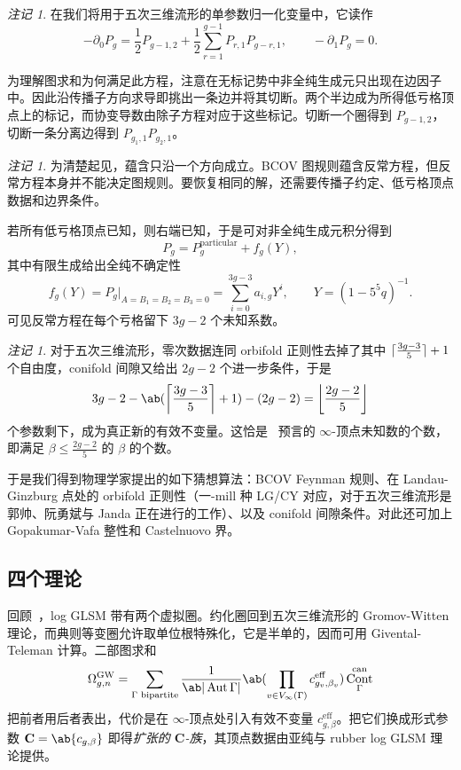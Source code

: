 \documentclass{amsart}
\theoremstyle{definition}
\theoremstyle{remark}
\newtheorem{rmk}[thm]{注记}
\theoremstyle{plain}
\theoremstyle{definition}
\theoremstyle{remark}
\DeclarePairedDelimiter{\floor}{\lfloor}{\rfloor}
\DeclarePairedDelimiter{\ceil}{\lceil}{\rceil}
\newcommand{\mbf}[1]{\mathbf{#1}}
\newcommand{\mr}[1]{\mathrm{#1}}
\newcommand{\1}{\mathbf{1}}
\newcommand{\2}{\mathbf{2}}
\newcommand{\3}{\mathbf{3}}
\DeclareMathOperator{\Aut}{Aut}
\DeclareMathOperator{\Cont}{Cont}
\begin{document}
\begin{rmk}
    在我们将用于五次三维流形的单参数归一化变量中，它读作
    \[ -\partial_0 P_g = \frac{1}{2}P_{g-1,2} + \frac{1}{2}\sum_{r=1}^{g-1}P_{r,1}P_{g-r,1}, \qquad -\partial_1 P_g = 0. \]
\end{rmk}

为理解图求和为何满足此方程，注意在无标记势中非全纯生成元只出现在边因子中。因此沿传播子方向求导即挑出一条边并将其切断。两个半边成为所得低亏格顶点上的标记，而协变导数由除子方程对应于这些标记。切断一个圈得到 \(P_{g-1,2}\)，切断一条分离边得到 \(P_{g_1,1}P_{g_2,1}\)。

\begin{rmk}
    为清楚起见，蕴含只沿一个方向成立。BCOV 图规则蕴含反常方程，但反常方程本身并不能决定图规则。要恢复相同的解，还需要传播子约定、低亏格顶点数据和边界条件。
\end{rmk}

若所有低亏格顶点已知，则右端已知，于是可对非全纯生成元积分得到
\[ P_g = P_g^{\mr{particular}} + f_g(Y), \]
其中有限生成给出全纯不确定性
\[ f_g(Y) = P_g|_{A = B_1 = B_2 = B_3 = 0} = \sum_{i=0}^{3g-3}a_{i,g}Y^i, \qquad Y = (1-5^5q)^{-1}. \]
可见反常方程在每个亏格留下 \(3g-2\) 个未知系数。

\begin{rmk}
    对于五次三维流形，零次数据连同 orbifold 正则性去掉了其中 \(\ceil{\frac{3g-3}{5}}+1\) 个自由度，conifold 间隙又给出 \(2g-2\) 个进一步条件，于是
    \[ 3g-2 - \ab(\ceil*{\frac{3g-3}{5}}+1) - (2g-2) = \floor*{\frac{2g-2}{5}} \]
    个参数剩下，成为真正新的有效不变量。这恰是~ 预言的 \(\infty\)-顶点未知数的个数，即满足 \(\beta \leq \frac{2g-2}{5}\) 的 \(\beta\) 的个数。
\end{rmk}

于是我们得到物理学家提出的如下猜想算法：BCOV Feynman 规则、在 Landau-Ginzburg 点处的 orbifold 正则性（一-mill 种 LG/CY 对应，对于五次三维流形是郭帅、阮勇斌与 Janda 正在进行的工作）、以及 conifold 间隙条件。对此还可加上 Gopakumar-Vafa 整性和 Castelnuovo 界。

\subsection{四个理论}%
\label{sub:Four theories}

回顾~，log GLSM 带有两个虚拟圈。约化圈回到五次三维流形的 Gromov-Witten 理论，而典则等变圈允许取单位根特殊化，它是半单的，因而可用 Givental-Teleman 计算。二部图求和
\[ \Omega^{\mr{GW}}_{g,n} = \sum_{\Gamma \text{ bipartite}} \frac{1}{\ab|\Aut \Gamma|} \ab( \prod_{v \in V_{\infty}(\Gamma)} c^{\mr{eff}}_{g_v,\beta_v}) \Cont^{\mr{can}}_{\Gamma} \]
把前者用后者表出，代价是在 \(\infty\)-顶点处引入有效不变量 \(c^{\mr{eff}}_{g,\beta}\)。把它们换成形式参数 \(\mbf{C} = \ab\{c_{g,\beta}\}\) 即得\textit{扩张的 \(\mbf{C}\)-族}，其顶点数据由亚纯与 rubber log GLSM 理论提供。
\end{document}
